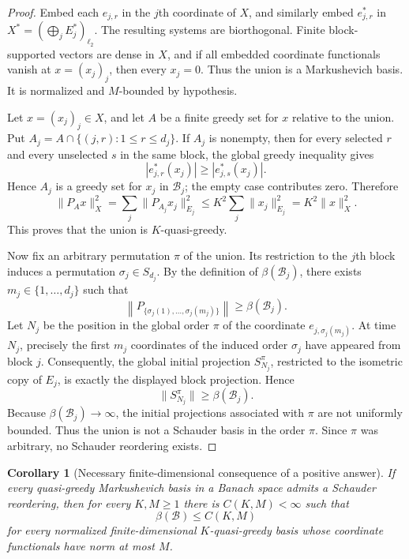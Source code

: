 \documentclass[11pt]{article}
\newtheorem{corollary}[theorem]{Corollary}
\newcommand{\cB}{\mathcal B}
\begin{document}
\begin{proof}
Embed each $e_{j,r}$ in the $j$th coordinate of $X$, and similarly embed
$e_{j,r}^*$ in $X^*=(\bigoplus_jE_j^*)_{\ell_2}$.  The resulting systems are
biorthogonal.  Finite block-supported vectors are dense in $X$, and if all
embedded coordinate functionals vanish at $x=(x_j)_j$, then every $x_j=0$.
Thus the union is a Markushevich basis.  It is normalized and $M$-bounded by
hypothesis.

Let $x=(x_j)_j\in X$, and let $A$ be a finite greedy set for $x$ relative to
the union.  Put $A_j=A\cap\{(j,r):1\le r\le d_j\}$.  If $A_j$ is nonempty,
then for every selected $r$ and every unselected $s$ in the same block, the
global greedy inequality gives
\[
  |e_{j,r}^*(x_j)|\ge |e_{j,s}^*(x_j)|.
\]
Hence $A_j$ is a greedy set for $x_j$ in $\cB_j$; the empty case contributes
zero.  Therefore
\[
 \|P_Ax\|_X^2
   =\sum_j\|P_{A_j}x_j\|_{E_j}^2
   \le K^2\sum_j\|x_j\|_{E_j}^2
   =K^2\|x\|_X^2.
\]
This proves that the union is $K$-quasi-greedy.

Now fix an arbitrary permutation $\pi$ of the union.  Its restriction to the
$j$th block induces a permutation $\sigma_j\in S_{d_j}$.  By the definition
of $\beta(\cB_j)$, there exists $m_j\in\{1,\ldots,d_j\}$ such that
\[
 \left\|P_{\{\sigma_j(1),\ldots,\sigma_j(m_j)\}}\right\|
 \ge \beta(\cB_j).
\]
Let $N_j$ be the position in the global order $\pi$ of the coordinate
$e_{j,\sigma_j(m_j)}$.  At time $N_j$, precisely the first $m_j$ coordinates
of the induced order $\sigma_j$ have appeared from block $j$.  Consequently,
the global initial projection $S_{N_j}^{\pi}$, restricted to the isometric
copy of $E_j$, is exactly the displayed block projection.  Hence
\[
  \|S_{N_j}^{\pi}\|\ge\beta(\cB_j).
\]
Because $\beta(\cB_j)\to\infty$, the initial projections associated with
$\pi$ are not uniformly bounded.  Thus the union is not a Schauder basis in
the order $\pi$.  Since $\pi$ was arbitrary, no Schauder reordering exists.
\end{proof}

\begin{corollary}[Necessary finite-dimensional consequence of a positive answer]
If every quasi-greedy Markushevich basis in a Banach space admits a Schauder
reordering, then for every $K,M\ge1$ there is $C(K,M)<\infty$ such that
\[
  \beta(\cB)\le C(K,M)
\]
for every normalized finite-dimensional $K$-quasi-greedy basis whose
coordinate functionals have norm at most $M$.
\end{corollary}
\end{document}
